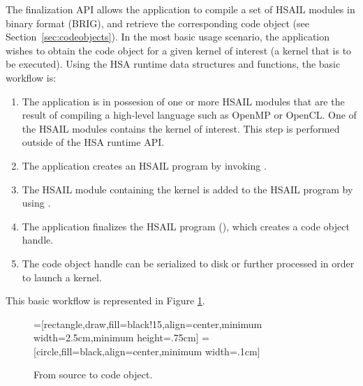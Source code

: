 \documentclass[final,oneside]{book}
\begin{document}
The finalization API allows the application to compile a set of HSAIL modules in
binary format (BRIG), and retrieve the corresponding code object (see
Section~\ref{sec:codeobjects}). In the most basic usage scenario, the
application wishes to obtain the code object for a given kernel of interest (a
kernel that is to be executed). Using the HSA runtime data structures and
functions, the basic workflow is:
\begin{enumerate}
\item The application is in possesion of one or more HSAIL modules that are the
  result of compiling a high-level language such as OpenMP or OpenCL. One of the
  HSAIL modules contains the kernel of interest. This step is performed
  outside of the HSA runtime API.
\item The application creates an HSAIL program by invoking
  .
\item The HSAIL module containing the kernel is added to the HSAIL program by
  using .
\item The application finalizes the HSAIL program
  (), which creates a code object handle.
\item The code object handle can be serialized to disk or further processed in
  order to launch a kernel.
\end{enumerate}
This basic workflow is represented in Figure \ref{fig:finalization}.
\vspace{1cm}
\begin{figure}[h]
  \centering
  =[rectangle,draw,fill=black!15,align=center,minimum width=2.5cm,minimum height=.75cm]
  =[circle,fill=black,align=center,minimum width=.1cm]
  \caption{From source to code object.}
  \label{fig:finalization}
\end{figure}
\end{document}
